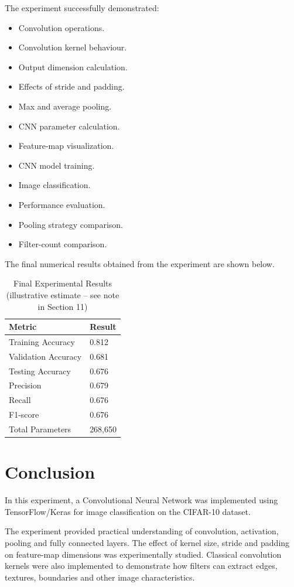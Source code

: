 \documentclass[11pt]{article}
\begin{document}
The experiment successfully demonstrated:
\begin{itemize}
    \item Convolution operations.
    \item Convolution kernel behaviour.
    \item Output dimension calculation.
    \item Effects of stride and padding.
    \item Max and average pooling.
    \item CNN parameter calculation.
    \item Feature-map visualization.
    \item CNN model training.
    \item Image classification.
    \item Performance evaluation.
    \item Pooling strategy comparison.
    \item Filter-count comparison.
\end{itemize}

The final numerical results obtained from the experiment are shown below.

\begin{table}[h]
\centering
\caption{Final Experimental Results (illustrative estimate -- see note in Section 11)}
\begin{tabular}{|l|l|}
\hline
\textbf{Metric} & \textbf{Result} \\
\hline
Training Accuracy & 0.812 \\
Validation Accuracy & 0.681 \\
Testing Accuracy & 0.676 \\
Precision & 0.679 \\
Recall & 0.676 \\
F1-score & 0.676 \\
Total Parameters & 268,650 \\
\hline
\end{tabular}
\end{table}

\section{Conclusion}
In this experiment, a Convolutional Neural Network was implemented using TensorFlow/Keras for image classification on the CIFAR-10 dataset.

The experiment provided practical understanding of convolution, activation, pooling and fully connected layers. The effect of kernel size, stride and padding on feature-map dimensions was experimentally studied. Classical convolution kernels were also implemented to demonstrate how filters can extract edges, textures, boundaries and other image characteristics.
\end{document}
